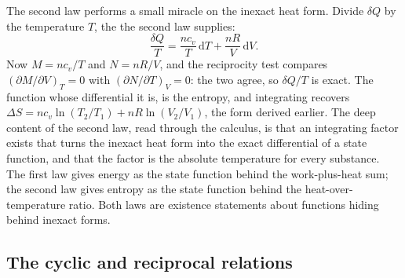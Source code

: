 

The second law performs a small miracle on the inexact heat form. Divide
$\delta Q$ by the temperature $T$, the  the
second law supplies:
\[
\frac{\delta Q}{T} = \frac{nc_v}{T}\,\mathrm{d}T + \frac{nR}{V}\,\mathrm{d}V.
\]
Now $M = nc_v/T$ and $N = nR/V$, and the reciprocity test compares
$(\partial M/\partial V)_T = 0$ with $(\partial N/\partial T)_V = 0$: the two
agree, so $\delta Q/T$ is exact. The function whose differential it is, is
the entropy, and integrating recovers $\Delta S = nc_v\ln(T_2/T_1) +
nR\ln(V_2/V_1)$, the form derived earlier. The deep content of the second
law, read through the calculus, is that an integrating factor exists that
turns the inexact heat form into the exact differential of a state function,
and that the factor is the absolute temperature for every substance. The
first law gives energy as the state function behind the work-plus-heat sum;
the second law gives entropy as the state function behind the heat-over-
temperature ratio. Both laws are existence statements about functions hiding
behind inexact forms.

\subsection{The cyclic and reciprocal relations}

